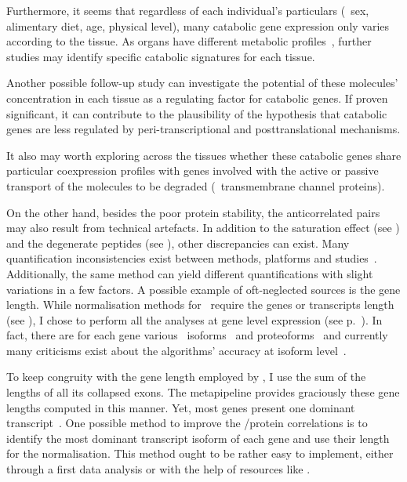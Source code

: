 Furthermore, it seems that regardless of each individual's particulars
(\eg\ sex, alimentary diet, age, physical level),
many catabolic gene expression only varies according to the tissue.
As organs have different metabolic profiles~,
further studies may identify specific catabolic signatures for each tissue.

Another possible follow-up study can investigate
the potential of these molecules' concentration in each tissue
as a regulating factor for catabolic genes.
If proven significant,
it can contribute to the plausibility of the hypothesis that
catabolic genes are less regulated
by peri-transcriptional and posttranslational mechanisms.

It also may worth exploring across the tissues
whether these catabolic genes share particular coexpression profiles
with genes involved with the active or passive transport of the molecules
to be degraded (\eg\ transmembrane channel proteins).

On the other hand,
besides the poor protein stability,
the anticorrelated pairs may also result from technical artefacts.
In addition to the saturation effect (see )
and the degenerate peptides (see ),
other discrepancies can exist.
Many quantification inconsistencies exist
between methods, platforms and studies~.
Additionally, the same method can yield different quantifications
with slight variations in a few factors.
A possible example of oft-neglected sources is the gene length.
While normalisation methods for \Rnaseq\ require the genes or transcripts length
(see ),
I chose to perform all the analyses at gene level expression
(see p.~\pageref{minisec:quantNorm}).
In fact, there are for each gene various \mRNA\ isoforms~
and proteoforms~
and currently many criticisms exist about
the algorithms' accuracy at isoform level~.\mybr\

To keep congruity with the gene length
employed by ,
I use the sum of the lengths of all its collapsed exons.
The metapipeline
 provides
graciously these gene lengths computed in this manner.
Yet, most genes present one dominant transcript~.
One possible method to improve the \mRNA/protein correlations
is to identify the most dominant transcript isoform of each gene
and use their length for the normalisation.
This method ought to be rather easy to implement,
either through a first data analysis
or with the help of resources like
.

